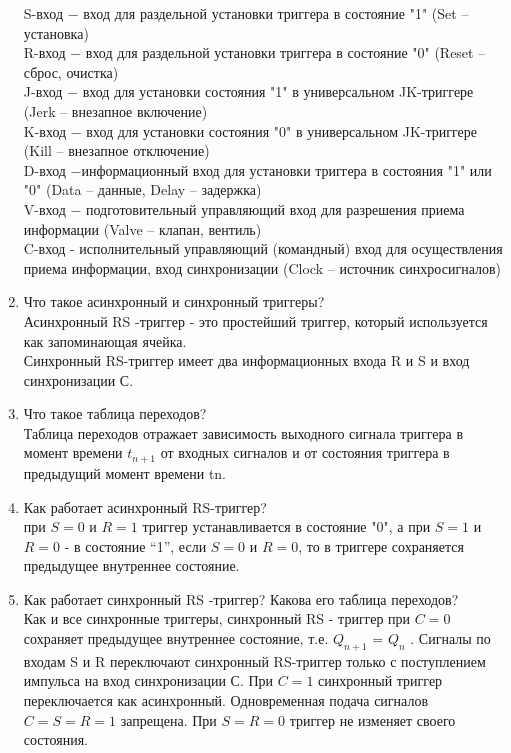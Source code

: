 \begin{enumerate}
	S-вход − вход для раздельной установки триггера в состояние "1" (Set – установка)\\
R-вход − вход для раздельной установки триггера в состояние "0" (Reset – сброс, очистка)\\
J-вход − вход для установки состояния "1" в универсальном JK-триггере (Jerk – внезапное
включение)\\
K-вход − вход для установки состояния "0" в универсальном JK-триггере (Kill – внезапное
отключение)\\
D-вход −информационный вход для установки триггера в состояния "1" или "0" (Data – данные,
Delay – задержка)\\
V-вход − подготовительный управляющий вход для разрешения приема информации (Valve –
клапан, вентиль)\\
C-вход - исполнительный управляющий (командный) вход для осуществления приема
информации, вход синхронизации (Clock – источник синхросигналов)
	\item Что такое асинхронный и синхронный триггеры? \\
	Асинхронный RS -триггер - это простейший триггер, который
используется как запоминающая ячейка.\\
Синхронный RS-триггер имеет два информационных входа R и S и вход
синхронизации С.
	\item Что такое таблица переходов? \\
	Таблица переходов отражает зависимость выходного сигнала триггера в
момент времени $t_{n+1}$ от входных сигналов и от состояния триггера в
предыдущий момент времени tn.
	\item Как работает асинхронный RS-триггер? \\
	при $S = 0$ и $R = 1$ триггер устанавливается в состояние "0", а при $S = 1$ и $R =
0$ - в состояние “1”, если $S = 0$ и $R = 0$, то в триггере сохраняется
предыдущее внутреннее состояние.
	\item Как работает синхронный RS -триггер? Какова его таблица переходов? \\
	Как и все синхронные триггеры, синхронный RS - триггер при $C = 0$
сохраняет предыдущее внутреннее состояние, т.е. $Q_{n+1}$ = $Q_n$ . Сигналы по
входам S и R переключают синхронный RS-триггер только с
поступлением импульса на вход синхронизации С. При $C = 1$ синхронный
триггер переключается как асинхронный. Одновременная подача
сигналов $C = S = R= 1$ запрещена. При $S = R = 0$ триггер не изменяет своего
состояния.


\end{enumerate}
